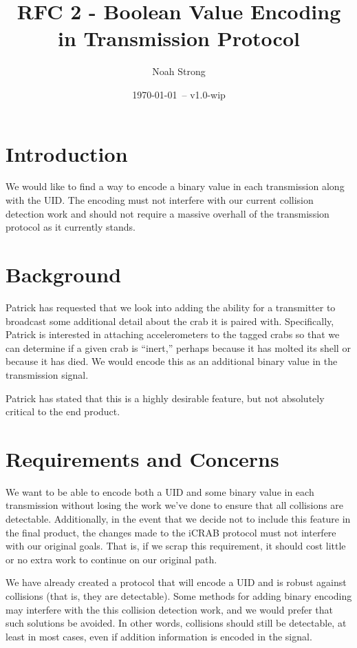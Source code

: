 \documentclass[12pt]{article}
\title{RFC 2 - Boolean Value Encoding in Transmission Protocol}
\author{
	Noah Strong
}
\date{\today\ -- v1.0-wip}
\begin{document}
\maketitle

\tableofcontents{}

\section{Introduction}

We would like to find a way to encode a binary value in each transmission
along with the UID.
The encoding must not interfere with our current collision detection work
and should not require a massive overhall of the transmission protocol as it
currently stands.

\section{Background}

Patrick has requested that we look into adding the ability for a transmitter to
broadcast some additional detail about the crab it is paired with.
Specifically, Patrick is interested in attaching accelerometers to the tagged
crabs so that we can determine if a given crab is ``inert,'' perhaps because it
has molted its shell or because it has died. We would encode this as an
additional binary value in the transmission signal.

Patrick has stated that this is a highly desirable feature, but not absolutely
critical to the end product.

\section{Requirements and Concerns}

We want to be able to encode both a UID and some binary value in each
transmission without losing the work we've done to ensure that all collisions
are detectable. Additionally, in the event that we decide not to include this
feature in the final product, the changes made to the iCRAB protocol must not
interfere with our original goals. That is, if we scrap this requirement, it
should cost little or no extra work to continue on our original path.

We have already created a protocol that will encode a UID and is robust against
collisions (that is, they are detectable).
Some methods for adding binary encoding may interfere with the this collision
detection work, and we would prefer that such solutions be avoided.
In other words, collisions should still be detectable, at least in most cases,
even if addition information is encoded in the signal.
\end{document}
